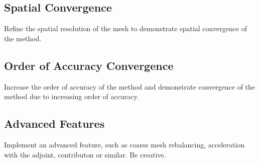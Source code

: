 \documentclass[12pts]{exam}
\begin{document}
	\subsection{Spatial Convergence}

        Refine the spatial resolution of the mesh to 
        demonstrate spatial convergence of the method.

	\subsection{Order of Accuracy Convergence}
        
        Increase the order of accuracy of the method and demonstrate 
        convergence of the method due to increasing order of 
        accuracy.

	\subsection{Advanced Features}
        Implement an advanced feature, such as coarse mesh rebalancing, 
        acceleration with the adjoint, contributon or similar. Be creative.
\end{document}

